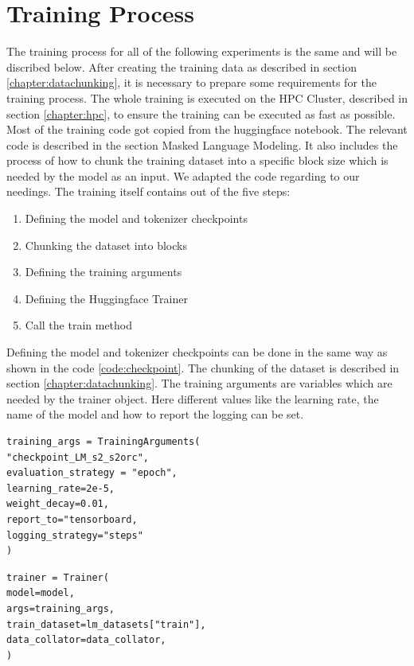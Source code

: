 \section{Training Process}
\alert{The training process for all of the following experiments is the same and will be discribed below.}
After creating the training data as described in section \ref{chapter:datachunking}, it is necessary to prepare some requirements for the training process. The whole training is executed on the HPC Cluster, \alert{described in section \ref{chapter:hpc}}, \alert{to ensure the training can be executed as fast as possible}.
\alert{Most of the training code got copied from the huggingface notebook. The relevant code is described in the section Masked Language Modeling}. It also includes the process of how to chunk the training dataset into a specific block size which is needed by the model as an input. We adapted the code regarding to our needings. \newline
The training itself contains out of the five steps:
\begin{enumerate}
	\item Defining the model and tokenizer checkpoints
	\item Chunking the dataset into blocks
	\item Defining the training arguments
	\item Defining the Huggingface Trainer
	\item Call the train method
\end{enumerate}

Defining the model and tokenizer checkpoints can be done in the same way as shown in the code \ref{code:checkpoint}. The chunking of the dataset is described in section \ref{chapter:datachunking}. The training arguments are variables which are needed by the trainer object. Here different values like the learning rate, the name of the model and how to report the logging can be set.

\begin{code}
	\label{code:train_args}
\begin{verbatim}
training_args = TrainingArguments(
"checkpoint_LM_s2_s2orc",
evaluation_strategy = "epoch",
learning_rate=2e-5,
weight_decay=0.01,
report_to="tensorboard,
logging_strategy="steps"
)
\end{verbatim}
\end{code}

\begin{code}
	\label{code:trainer}
\begin{verbatim}
trainer = Trainer(
model=model,
args=training_args,
train_dataset=lm_datasets["train"],
data_collator=data_collator,
)
\end{verbatim}
\end{code}

